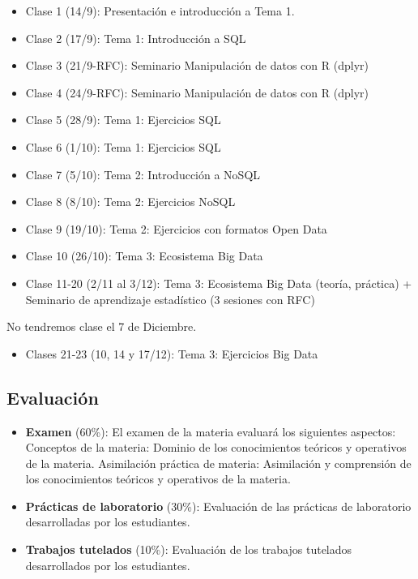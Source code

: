 \documentclass[]{book}
\providecommand{\tightlist}{%
  \setlength{\itemsep}{0pt}\setlength{\parskip}{0pt}}
\begin{document}
\begin{itemize}
\item
  Clase 1 (14/9): Presentación e introducción a Tema 1.
\item
  Clase 2 (17/9): Tema 1: Introducción a SQL
\item
  Clase 3 (21/9-RFC): Seminario Manipulación de datos con R (dplyr)
\item
  Clase 4 (24/9-RFC): Seminario Manipulación de datos con R (dplyr)
\item
  Clase 5 (28/9): Tema 1: Ejercicios SQL
\item
  Clase 6 (1/10): Tema 1: Ejercicios SQL
\item
  Clase 7 (5/10): Tema 2: Introducción a NoSQL
\item
  Clase 8 (8/10): Tema 2: Ejercicios NoSQL
\item
  Clase 9 (19/10): Tema 2: Ejercicios con formatos Open Data
\item
  Clase 10 (26/10): Tema 3: Ecosistema Big Data
\item
  Clase 11-20 (2/11 al 3/12): Tema 3: Ecosistema Big Data (teoría, práctica) + Seminario de aprendizaje estadístico (3 sesiones con RFC)
\end{itemize}

No tendremos clase el 7 de Diciembre.

\begin{itemize}
\tightlist
\item
  Clases 21-23 (10, 14 y 17/12): Tema 3: Ejercicios Big Data
\end{itemize}

\hypertarget{evaluacion}{%
\subsection{Evaluación}\label{evaluacion}}

\begin{itemize}
\item
  \textbf{Examen} (60\%): El examen de la materia evaluará los siguientes aspectos:
  Conceptos de la materia: Dominio de los conocimientos teóricos y operativos de la materia.
  Asimilación práctica de materia: Asimilación y comprensión de los conocimientos teóricos y operativos de la materia.
\item
  \textbf{Prácticas de laboratorio} (30\%): Evaluación de las prácticas de laboratorio desarrolladas por los estudiantes.
\item
  \textbf{Trabajos tutelados} (10\%): Evaluación de los trabajos tutelados desarrollados por los estudiantes.
\end{itemize}
\end{document}
